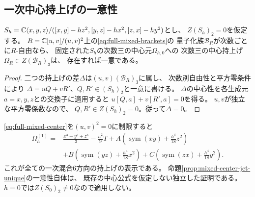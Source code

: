 \subsection{一次中心持上げの一意性}
\begin{proposition}\label{prop:mixed-center-jet-unique}
$S_h=\mathbb C\langle x,y,z\rangle/
([x,y]-hz^2,[y,z]-hx^2,[z,x]-hy^2)$とし、
$Z(S_h)_2=0$を仮定する。
$R=\mathbb C[u,v]/(u,v)^2$上の\eqref{eq:full-mixed-brackets}の
量子化族$\mathcal B_R$が次数ごとに$R$-自由なら、
固定された$S_h$の次数三の中心元$\Omega_{h,0}$への
次数三の中心持上げ$\Omega_R\in Z(\mathcal B_R)_3$は、
存在すれば一意である。
\end{proposition}
\begin{proof}
二つの持上げの差$\Delta$は$(u,v)(\mathcal B_R)_3$に属し、
次数別自由性と平方零条件により
$\Delta=uQ+vR'$、$Q,R'\in(S_h)_2$と一意に書ける。
$\Delta$の中心性を各生成元$a=x,y,z$との交換子に適用すると
$u[Q,a]+v[R',a]=0$を得る。
$u,v$が独立な平方零係数なので、
$Q,R'\in Z(S_h)_2=0$。従って$\Delta=0$。
\end{proof}
\begin{remark}
\eqref{eq:full-mixed-center}を$(u,v)^2=0$に制限すると
\[
\begin{aligned}
 \Omega_h^{(1)}
 ={}&\frac{x^3+y^3+z^3}{3}-\frac{h^2}{9}T
 +A\left(\operatorname{sym}(xy)+\frac{h^4}{18}z^2\right)\\
 &+B\left(\operatorname{sym}(yz)+\frac{h^4}{18}x^2\right)
 +C\left(\operatorname{sym}(zx)+\frac{h^4}{18}y^2\right).
\end{aligned}
\]
これが全ての一次混合6方向の持上げの表示である。
命題\ref{prop:mixed-center-jet-unique}の一意性自体は、
既存の中心公式を仮定しない独立した証明である。
$h=0$では$Z(S_0)_2\ne0$なので適用しない。
\end{remark}

